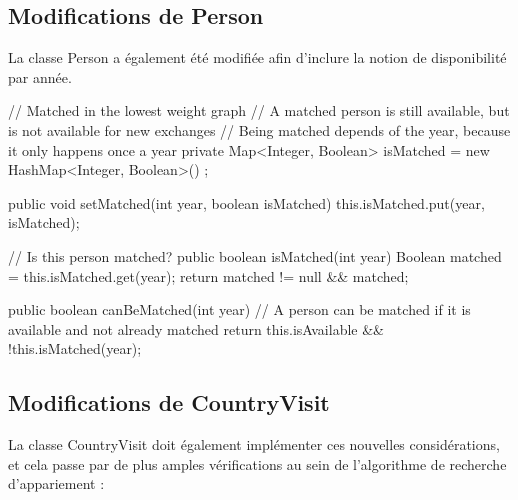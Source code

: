 \documentclass{mytex}
\begin{document}



\subsection{Modifications de Person}

La classe Person a également été modifiée afin d'inclure la notion de disponibilité par année.

\begin{codebox}
// Matched in the lowest weight graph
// A matched person is still available, but is not available for new exchanges
// Being matched depends of the year, because it only happens once a year
private Map<Integer, Boolean> isMatched = new HashMap<Integer, Boolean>() ;

public void setMatched(int year, boolean isMatched) {
	this.isMatched.put(year, isMatched);
}

// Is this person matched?
public boolean isMatched(int year) {
	Boolean matched = this.isMatched.get(year);
	return matched != null && matched;
}

public boolean canBeMatched(int year) {
	// A person can be matched if it is available and not already matched
	return this.isAvailable && !this.isMatched(year);
}
\end{codebox}

\subsection{Modifications de CountryVisit}

La classe CountryVisit doit également implémenter ces nouvelles considérations, et cela passe par de plus amples vérifications au sein de l'algorithme de recherche d'appariement :
\end{document}
